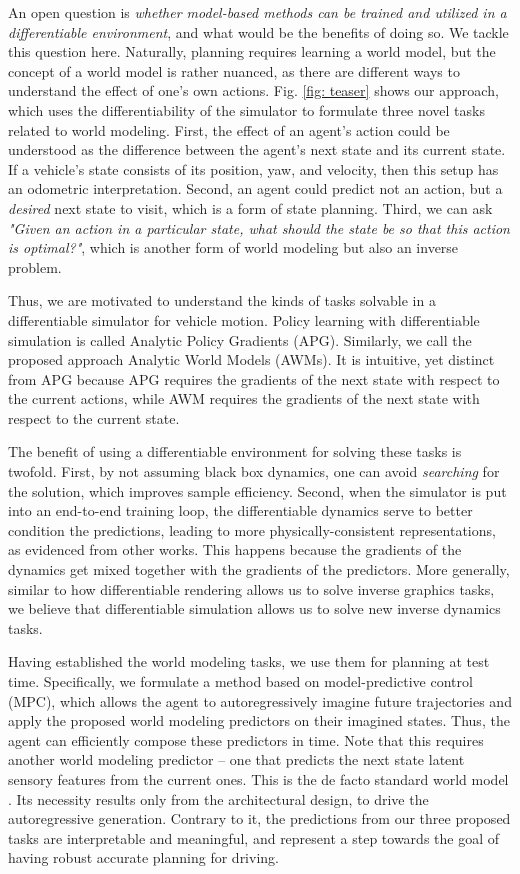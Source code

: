 An open question is \emph{whether model-based methods can be trained and utilized in a differentiable environment}, and what would be the benefits of doing so. We tackle this question here. Naturally, planning requires learning a world model, but the concept of a world model is rather nuanced, as there are different ways to understand the effect of one's own actions. Fig. \ref{fig: teaser} shows our approach, which uses the differentiability of the simulator to formulate three novel tasks related to world modeling. First, the effect of an agent's action could be understood as the difference between the agent's next state and its current state. If a vehicle's state consists of its position, yaw, and velocity, then this setup has an odometric interpretation. Second, an agent could predict not an action, but a \emph{desired} next state to visit, which is a form of state planning. Third, we can ask \emph{"Given an action in a particular state, what should the state be so that this action is optimal?"}, which is another form of world modeling but also an inverse problem.

Thus, we are motivated to understand the kinds of tasks solvable in a differentiable simulator for vehicle motion. Policy learning with differentiable simulation is called Analytic Policy Gradients (APG). Similarly, we call the proposed approach Analytic World Models (AWMs). It is intuitive, yet distinct from APG because APG requires the gradients of the next state with respect to the current actions, while AWM requires the gradients of the next state with respect to the current state.

The benefit of using a differentiable environment for solving these tasks is twofold. First, by not assuming black box dynamics, one can avoid \emph{searching} for the solution, which improves sample efficiency. Second, when the simulator is put into an end-to-end training loop, the differentiable dynamics serve to better condition the predictions, leading to more physically-consistent representations, as evidenced from other works. This happens because the gradients of the dynamics get mixed together with the gradients of the predictors. More generally, similar to how differentiable rendering \cite{laine2020modular, jakob2022dr} allows us to solve inverse graphics tasks, we believe that differentiable simulation allows us to solve new inverse dynamics tasks.

Having established the world modeling tasks, we use them for planning at test time. Specifically, we formulate a method based on model-predictive control (MPC), which allows the agent to autoregressively imagine future trajectories and apply the proposed world modeling predictors on their imagined states. Thus, the agent can efficiently compose these predictors in time. Note that this requires another world modeling predictor -- one that predicts the next state latent sensory features from the current ones. This is the de facto standard world model \cite{ha2018world}. Its necessity results only from the architectural design, to drive the autoregressive generation. Contrary to it, the predictions from our three proposed tasks are interpretable and meaningful, and represent a step towards the goal of having robust accurate planning for driving.

